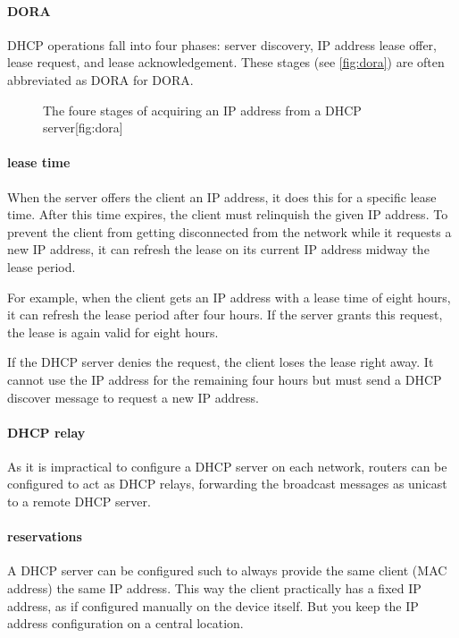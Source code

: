 \paragraph{\acs{DORA}}
\gls{DHCP} operations fall into four phases: server discovery, \acs{IP} address lease offer, lease request, and lease acknowledgement.
These stages (see \vref{fig:dora}) are often abbreviated as \acs{DORA} for \acl{DORA}.

\begin{figure}
\begin{sidecaption}{The foure stages of acquiring an \acs{IP} address from a \acs{DHCP} server}[fig:dora]
\centering

\end{sidecaption}
\end{figure}

\paragraph{lease time}
When the server offers the client an \acs{IP} address, it does this for a specific lease time.
After this time expires, the client must relinquish the given \acs{IP} address.
To prevent the client from getting disconnected from the network while it requests a new \acs{IP} address, it can refresh the lease on its current \acs{IP} address midway the lease period.

For example, when the client gets an \acs{IP} address with a lease time of eight hours, it can refresh the lease period after four hours.
If the server grants this request, the lease is again valid for eight hours.

If the \acs{DHCP} server denies the request, the client loses the lease right away.
It cannot use the \acs{IP} address for the remaining four hours but must send a \acs{DHCP} discover message to request a new \acs{IP} address.

\paragraph{\acs{DHCP} relay}
As it is impractical to configure a \acs{DHCP} server on each network, routers can be configured to act as \acs{DHCP} relays, forwarding the broadcast messages%
as unicast to a remote \acs{DHCP} server.

\paragraph{reservations}
A \acs{DHCP} server can be configured such to always provide the same client (\acs{MAC} address) the same \acs{IP} address.
This way the client practically has a fixed \acs{IP} address, as if configured manually on the device itself.
But you keep the \acs{IP} address configuration on a central location.




